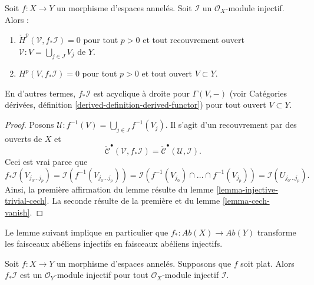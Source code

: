 \begin{lemma}

\label{lemma-pushforward-injective}

Soit $f : X \to Y$ un morphisme d'espaces annelés. Soit $\mathcal{I}$ un $\mathcal{O}_X$-module injectif. Alors :

\begin{enumerate}

\item  $\check{H}^p(\mathcal{V}, f_*\mathcal{I}) = 0$
pour tout $p > 0$ et tout recouvrement ouvert
$\mathcal{V} : V = \bigcup_{j \in J} V_j$ de $Y$.
\item  $H^p(V, f_*\mathcal{I}) = 0$ pour tout $p > 0$ et tout ouvert $V \subset Y$.

\end{enumerate}

En d'autres termes, $f_*\mathcal{I}$ est acyclique à droite pour $\Gamma(V, -)$
(voir Catégories dérivées, définition \ref{derived-definition-derived-functor}) pour tout ouvert $V \subset Y$.

\end{lemma}

\begin{proof}
Posons $\mathcal{U} : f^{-1}(V) = \bigcup_{j \in J} f^{-1}(V_j)$. Il s'agit d'un recouvrement par des ouverts de $X$ et $$
\check{\mathcal{C}}^\bullet(\mathcal{V}, f_*\mathcal{I}) =
\check{\mathcal{C}}^\bullet(\mathcal{U}, \mathcal{I}).
$$ Ceci est vrai parce que $$
f_*\mathcal{I}(V_{j_0 \ldots j_p})
= \mathcal{I}(f^{-1}(V_{j_0 \ldots j_p})) =
\mathcal{I}(f^{-1}(V_{j_0}) \cap \ldots \cap f^{-1}(V_{j_p}))
= \mathcal{I}(U_{j_0 \ldots j_p}).
$$ Ainsi, la première affirmation du lemme résulte du lemme \ref{lemma-injective-trivial-cech}. La seconde résulte de la première et du lemme \ref{lemma-cech-vanish}.
\end{proof}

\noindent
Le lemme suivant implique en particulier que $f_* : \textit{Ab}(X) \to \textit{Ab}(Y)$ transforme les faisceaux abéliens injectifs en faisceaux abéliens injectifs.

\begin{lemma}

\label{lemma-pushforward-injective-flat}
Soit $f : X \to Y$ un morphisme d'espaces annelés. Supposons que $f$ soit plat. Alors $f_*\mathcal{I}$ est un $\mathcal{O}_Y$-module injectif pour tout $\mathcal{O}_X$-module injectif $\mathcal{I}$.
\end{lemma}

